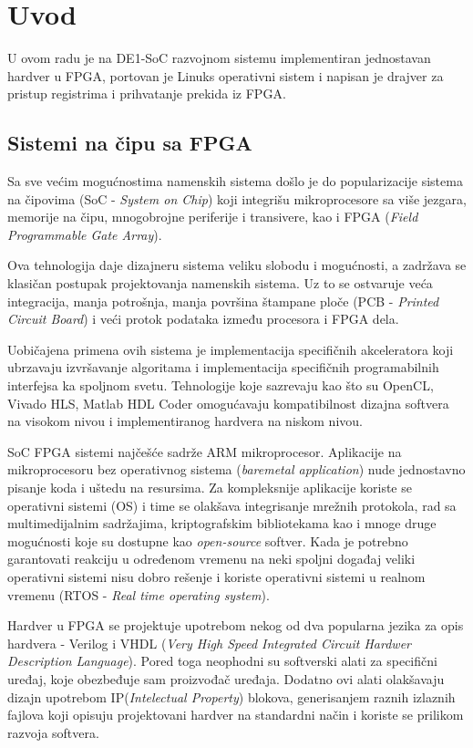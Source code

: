 \section{Uvod}
U ovom radu je na DE1-SoC razvojnom sistemu implementiran jednostavan hardver u FPGA, portovan je Linuks operativni sistem i napisan je drajver za pristup registrima i prihvatanje prekida iz FPGA.

\subsection{Sistemi na čipu sa FPGA}
Sa sve većim mogućnostima namenskih sistema došlo je do popularizacije sistema na čipovima (SoC - \textit{System on Chip}) koji integrišu mikroprocesore sa više jezgara, memorije na čipu, mnogobrojne periferije i transivere, kao i FPGA (\textit{Field Programmable Gate Array}).

Ova tehnologija daje dizajneru sistema veliku slobodu i mogućnosti, a zadržava se klasičan postupak projektovanja namenskih sistema. Uz to se ostvaruje veća integracija, manja potrošnja, manja površina štampane ploče (PCB - \textit{Printed Circuit Board}) i veći protok podataka između procesora i FPGA dela. 

Uobičajena primena ovih sistema je implementacija specifičnih akceleratora koji ubrzavaju izvršavanje algoritama i implementacija specifičnih programabilnih interfejsa ka spoljnom svetu. Tehnologije koje sazrevaju kao što su OpenCL, Vivado HLS, Matlab HDL Coder omogućavaju kompatibilnost dizajna softvera na visokom nivou i implementiranog hardvera na niskom nivou.

SoC FPGA sistemi najčešće sadrže ARM mikroprocesor. Aplikacije na mikroprocesoru bez operativnog sistema (\textit{baremetal application}) nude jednostavno pisanje koda i uštedu na resursima. Za kompleksnije aplikacije koriste se operativni sistemi (OS) i time se olakšava integrisanje mrežnih protokola, rad sa multimedijalnim sadržajima, kriptografskim bibliotekama kao i mnoge druge mogućnosti koje su dostupne kao \textit{open-source} softver. Kada je potrebno garantovati reakciju u određenom vremenu na neki spoljni događaj veliki operativni sistemi nisu dobro rešenje i koriste operativni sistemi u realnom vremenu (RTOS - \textit{Real time operating system}).

Hardver u FPGA se projektuje upotrebom nekog od dva popularna jezika za opis hardvera - Verilog i VHDL (\textit{Very High Speed Integrated Circuit Hardwer Description Language}). Pored toga neophodni su softverski alati za specifični uređaj, koje obezbeđuje sam proizvođač uređaja. Dodatno ovi alati olakšavaju dizajn upotrebom IP(\textit{Intelectual Property}) blokova, generisanjem raznih izlaznih fajlova koji opisuju projektovani hardver na standardni način i koriste se prilikom razvoja softvera.

